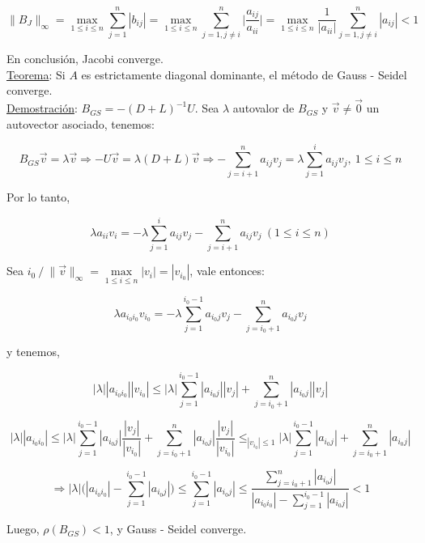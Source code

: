 $$\|B_{J}\|_{\infty} = \max \limits_{1 \leq i \leq n} \sum \limits_{j = 1}^{n} |b_{ij}| = \max \limits_{1 \leq i \leq n} \sum \limits_{j = 1, j \neq i}^{n} \bigg|\frac{a_{ij}}{a_{ii}}\bigg| = \max \limits_{1 \leq i \leq n} \frac{1}{|a_{ii}|} \sum \limits_{j = 1, j \neq i}^{n} |a_{ij}| < 1$$

En conclusi\'on, Jacobi converge.\\

\underline{Teorema}: Si $A$ es estrictamente diagonal dominante, el m\'etodo de Gauss - Seidel converge.\\

\underline{Demostraci\'on}: $B_{GS} = -(D + L)^{-1}U$. Sea $\lambda$ autovalor de $B_{GS}$ y $\Vec{v} \neq \Vec{0}$ un autovector asociado, tenemos:

$$B_{GS}\Vec{v} = \lambda \Vec{v} \Rightarrow -U\Vec{v} = \lambda(D + L)\Vec{v} \Rightarrow - \sum \limits_{j = i + 1}^{n} a_{ij}v_{j} = \lambda \sum \limits_{j = 1}^{i} a_{ij}v_{j},\ 1 \leq i \leq n$$

Por lo tanto,

$$\lambda a_{ii}v_{i} = -\lambda \sum \limits_{j = 1}^{i} a_{ij}v_{j} - \sum \limits_{j = i + 1}^{n} a_{ij}v_{j}\ (1 \leq i \leq n)$$

Sea $i_{0}\ / \ \|\Vec{v}\|_{\infty} = \max \limits_{1 \leq i \leq n} |v_{i}| = |v_{i_{0}}|$, vale entonces:

$$\lambda a_{i_{0}i_{0}}v_{i_{0}} = -\lambda \sum \limits_{j = 1}^{i_{0} - 1} a_{i_{0}j}v_{j} - \sum \limits_{j = i_{0} + 1}^{n} a_{i_{0}j}v_{j}$$

y tenemos,

$$|\lambda||a_{i_{0}i_{0}}||v_{i_{0}}| \leq |\lambda| \sum \limits_{j = 1}^{i_{0} - 1} |a_{i_{0}j}||v_{j}| + \sum \limits_{j = i_{0} + 1}^{n} |a_{i_{0}j}||v_{j}|$$

$$|\lambda||a_{i_{0}i_{0}}| \leq |\lambda| \sum \limits_{j = 1}^{i_{0} - 1} |a_{i_{0}j}|\frac{|v_{j}|}{|v_{i_{0}}|} + \sum \limits_{j = i_{0} + 1}^{n} |a_{i_{0}j}|\frac{|v_{j}|}{|v_{i_{0}}|} \leq_{|v_{i_{0}}| \leq 1} |\lambda|\sum \limits_{j = 1}^{i_{0} - 1} |a_{i_{0}j}| + \sum \limits_{j = i_{0} + 1}^{n} |a_{i_{0}j}|$$

$$\Rightarrow |\lambda| \bigg(|a_{i_{0}i_{0}}| - \sum \limits_{j = 1}^{i_{0} - 1} |a_{i_{0}j}| \bigg) \leq \sum \limits_{j = 1}^{i_{0} - 1} |a_{i_{0}j}| \leq \frac{\sum \limits_{j = i_{0} + 1}^{n} |a_{i_{0}j}|}{|a_{i_{0}i_{0}}| - \sum \limits_{j = 1}^{i_{0} - 1} |a_{i_{0}j}|} < 1$$

Luego, $\rho(B_{GS}) < 1$, y Gauss - Seidel converge.